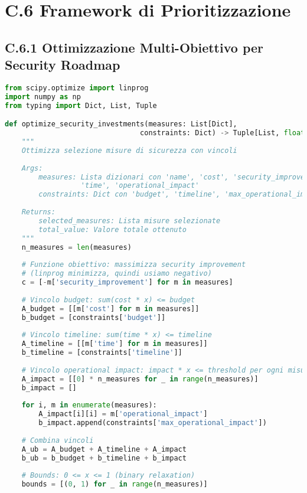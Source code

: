 \section{C.6 Framework di Prioritizzazione}

\subsection{C.6.1 Ottimizzazione Multi-Obiettivo per Security Roadmap}

\begin{lstlisting}[language=Python, caption=Framework Prioritizzazione Investimenti Sicurezza]
from scipy.optimize import linprog
import numpy as np
from typing import Dict, List, Tuple

def optimize_security_investments(measures: List[Dict], 
                                constraints: Dict) -> Tuple[List, float]:
    """
    Ottimizza selezione misure di sicurezza con vincoli
    
    Args:
        measures: Lista dizionari con 'name', 'cost', 'security_improvement', 
                  'time', 'operational_impact'
        constraints: Dict con 'budget', 'timeline', 'max_operational_impact'
    
    Returns:
        selected_measures: Lista misure selezionate
        total_value: Valore totale ottenuto
    """
    n_measures = len(measures)
    
    # Funzione obiettivo: massimizza security improvement
    # (linprog minimizza, quindi usiamo negativo)
    c = [-m['security_improvement'] for m in measures]
    
    # Vincolo budget: sum(cost * x) <= budget
    A_budget = [[m['cost'] for m in measures]]
    b_budget = [constraints['budget']]
    
    # Vincolo timeline: sum(time * x) <= timeline
    A_timeline = [[m['time'] for m in measures]]
    b_timeline = [constraints['timeline']]
    
    # Vincolo operational impact: impact * x <= threshold per ogni misura
    A_impact = [[0] * n_measures for _ in range(n_measures)]
    b_impact = []
    
    for i, m in enumerate(measures):
        A_impact[i][i] = m['operational_impact']
        b_impact.append(constraints['max_operational_impact'])
    
    # Combina vincoli
    A_ub = A_budget + A_timeline + A_impact
    b_ub = b_budget + b_timeline + b_impact
    
    # Bounds: 0 <= x <= 1 (binary relaxation)
    bounds = [(0, 1) for _ in range(n_measures)]
    

\end{lstlisting}

